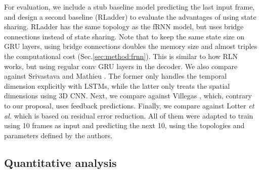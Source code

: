 \documentclass[runningheads]{llncs}
\begin{document}
For evaluation, we include a stub baseline model predicting the last input frame, and design a second baseline (RLadder) to evaluate the advantages of using state sharing. RLadder has the same topology as the fRNN model, but uses bridge connections instead of state sharing. Note that to keep the same state size on GRU layers, using bridge connections doubles the memory size and almost triples the computational cost (Sec.\ref{sec:method:frnn}). This is similar to how RLN \cite{ilin2017recurrent} works, but using regular conv GRU layers in the decoder. We also compare against Srivastava \cite{srivastava2015unsupervised} and Mathieu \cite{mathieu2015deep}. The former only handles the temporal dimension explicitly with LSTMs, while the latter only treats the spatial dimensions using 3D CNN. Next, we compare against Villegas \cite{villegas2017decomposing}, which, contrary to our proposal, uses feedback predictions. 
Finally, we compare against Lotter \emph{et al.} \cite{lotter2016deep} which is based on residual error reduction. All of them were adapted to train using 10 frames as input and predicting the next 10, using the topologies and parameters defined by the authors.

\subsection{Quantitative analysis}
\label{sec:experiments:quantitative}
\end{document}
